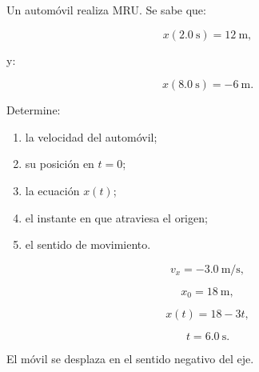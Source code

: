 \begin{ejercicio}
Un automóvil realiza MRU. Se sabe que:

\[
x(\SI{2.0}{\second})=\SI{12}{\meter},
\]

y:

\[
x(\SI{8.0}{\second})=-\SI{6}{\meter}.
\]

Determine:

\begin{enumerate}[label=\alph*)]
    \item la velocidad del automóvil;
    \item su posición en \(t=0\);
    \item la ecuación \(x(t)\);
    \item el instante en que atraviesa el origen;
    \item el sentido de movimiento.
\end{enumerate}
\end{ejercicio}

\begin{respuesta}
\[
v_x=-\SI{3.0}{\meter\per\second},
\]

\[
x_0=\SI{18}{\meter},
\]

\[
\boxed{x(t)=18-3t},
\]

\[
\boxed{t=\SI{6.0}{\second}}.
\]

El móvil se desplaza en el sentido negativo del eje.
\end{respuesta}


